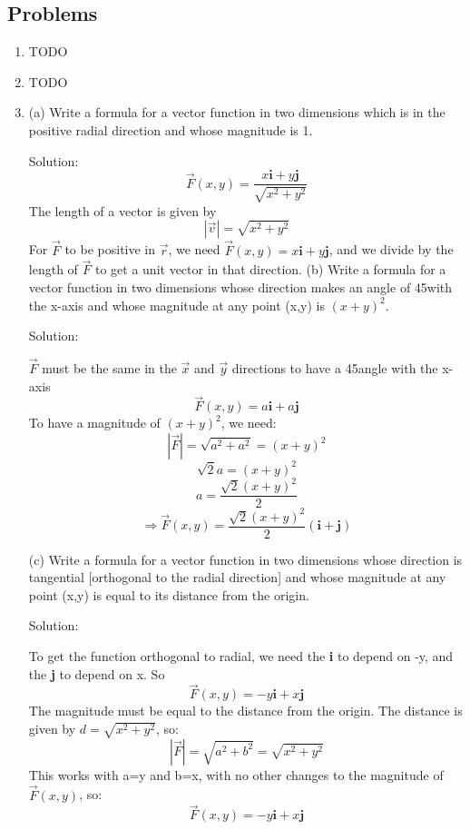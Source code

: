 \documentclass{article}
\begin{document}
\subsection*{Problems}
\begin{enumerate}
    \item TODO
    \item TODO
    \item
    (a) Write a formula for a vector function
    in two dimensions which is in the positive radial direction
    and whose magnitude is 1.

    Solution:
    \[ \vec{F}(x, y) = \frac{x\textbf{i} + y\textbf{j}}
    {\sqrt{x^2 + y^2}} \]
    The length of a vector is given by
    \[ |\vec{v}| =  \sqrt{x^2 + y^2} \]
    For $\vec{F}$ to be positive in $\vec{r}$, we need
    $\vec{F}(x,y) = x\textbf{i} + y\textbf{j}$, and we divide
    by the length of $\vec{F}$ to get a unit vector in that direction.
    \newline
    \newline
    (b) Write a formula for a vector function in two dimensions
    whose direction makes an angle of 45\degree with the x-axis and whose magnitude
    at any point (x,y) is $(x + y)^2$.

    Solution:

    $\vec{F}$ must be the same in the $\vec{x}$ and $\vec{y}$ directions
    to have a 45\degree angle with the x-axis
    \[ \vec{F}(x, y) = a\textbf{i} + a\textbf{j}\]
    To have a magnitude of $(x + y)^2$, we need:
    \[ |\vec{F}| = \sqrt{a^2 + a^2} = (x + y)^2 \]
    \[ \sqrt{2}a = (x + y)^2 \]
    \[ a = \frac{\sqrt{2}(x + y)^2}{2} \]
    \[ \Rightarrow \vec{F}(x,y) = \frac{\sqrt{2}(x+y)^2}{2}(\textbf{i} + \textbf{j}) \]

    (c) Write a formula for a vector function in two dimensions
    whose direction is tangential [orthogonal to the radial direction] and
    whose magnitude at any point (x,y) is equal to its distance
    from the origin.

    Solution:

    To get the function orthogonal to radial, we need the \textbf{i}
    to depend on -y, and the \textbf{j} to depend on
    x. So
    \[ \vec{F}(x,y) = -y\textbf{i} + x\textbf{j} \]
    The magnitude must be equal to the distance from the origin. The distance
    is given by $d=\sqrt{x^2+y^2}$, so:
    \[ |\vec{F}| = \sqrt{a^2+b^2} = \sqrt{x^2+y^2} \]
    This works with a=y and b=x, with no other changes to the
    magnitude of $\vec{F}(x,y)$, so:
    \[ \vec{F}(x,y) = -y\textbf{i} + x\textbf{j} \]


\end{enumerate}
\end{document}
